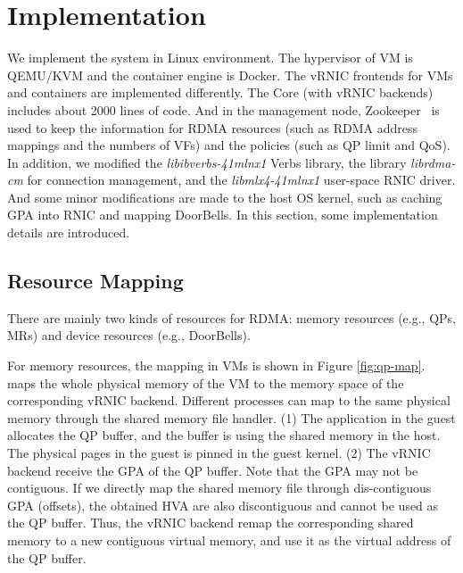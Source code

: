 \section{Implementation} \label{impl}
We implement the \sys system in Linux environment. The hypervisor of VM is QEMU/KVM and the container engine is Docker. The vRNIC frontends for VMs and containers are implemented differently. The \sys Core (with vRNIC backends) includes about 2000 lines of code.
And in the management node, Zookeeper~\cite{zookeeper} is used to keep the information for RDMA resources (such as RDMA address mappings and the numbers of VFs) and the policies (such as QP limit and QoS).
In addition, we modified the \textit{libibverbs-41mlnx1} Verbs library, the library \textit{librdma-cm} for connection management, and the \textit{libmlx4-41mlnx1} user-space RNIC driver.
And some minor modifications are made to the host OS kernel, such as caching GPA into RNIC and mapping DoorBells. In this section, some implementation details are introduced.

\subsection{Resource Mapping}

There are mainly two kinds of resources for RDMA: memory resources (e.g., QPs, MRs) and device resources (e.g., DoorBells). 


For memory resources, the mapping in VMs is shown in Figure \ref{fig:qp-map}. \sys maps the whole physical memory of the VM to the memory space of the corresponding vRNIC backend. Different processes can map to the same physical memory through the shared memory file handler. (1) The application in the guest allocates the QP buffer, and the buffer is using the shared memory in the host. The physical pages in the guest is pinned in the guest kernel. (2) The vRNIC backend receive the GPA of the QP buffer. Note that the GPA may not be contiguous. If we directly map the shared memory file through dis-contiguous GPA (offsets), the obtained HVA are also discontiguous and cannot be used as the QP buffer. Thus, the vRNIC backend remap the corresponding shared memory to a new contiguous virtual memory, and use it as the virtual address of the QP buffer.


